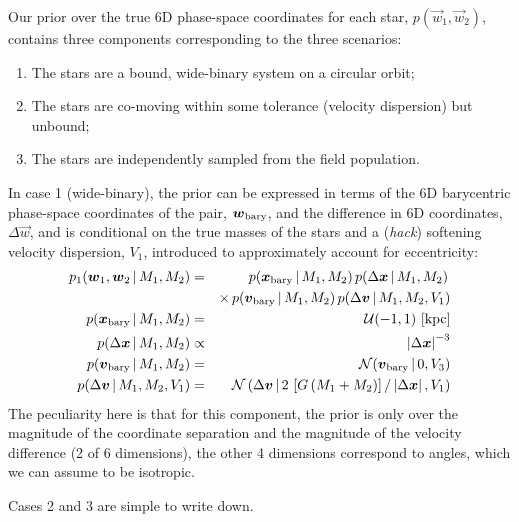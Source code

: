 \documentclass[12pt,letterpaper]{article}
\begin{document}
Our prior over the true 6D phase-space coordinates for each star, $p(\vec{w}_1,
\vec{w}_2)$, contains three components corresponding to the three scenarios:
\begin{enumerate}
    \item The stars are a bound, wide-binary system on a circular orbit;
    \item The stars are co-moving within some tolerance (velocity dispersion)
    but unbound;
    \item The stars are independently sampled from the field population.
\end{enumerate}
In case 1 (wide-binary), the prior can be expressed in terms of the 6D
barycentric phase-space coordinates of the pair, $\vec{w}_{\rm bary}$, and the
difference in 6D coordinates, $\Delta\vec{w}$, and is conditional on the true
masses of the stars and a (\emph{hack}) softening velocity dispersion, $V_1$,
introduced to approximately account for eccentricity:
\begin{eqnarray}
    p_1(\vec{w}_1, \vec{w}_2 \given M_1, M_2) &=&
        p(\vec{x}_{\rm bary} \given M_1, M_2) \,
        p(\Delta\vec{x} \given M_1, M_2) \, \\
    && \times \,
        p(\vec{v}_{\rm bary} \given M_1, M_2) \,
        p(\Delta\vec{v} \given M_1, M_2, V_1) \\
    p(\vec{x}_{\rm bary} \given M_1, M_2) &=& \mathcal{U}(-1,1)~[{\rm kpc}] \\
    p(\Delta\vec{x} \given M_1, M_2) &\propto& \left|\Delta\vec{x}\right|^{-3} \\
    p(\vec{v}_{\rm bary} \given M_1, M_2) &=&
      \mathcal{N}(\vec{v}_{\rm bary} \given 0, V_3) \\
    p(\Delta\vec{v} \given M_1, M_2, V_1) &=&
      \mathcal{N}\left(\Delta\vec{v} \given
        2\,\left[G \, (M_1+M_2)\right]/\left|\Delta\vec{x}\right|, V_1\right) \\
\end{eqnarray}
The peculiarity here is that for this component, the prior is only over the
magnitude of the coordinate separation and the magnitude of the velocity
difference (2 of 6 dimensions), the other 4 dimensions correspond to angles,
which we can assume to be isotropic.

Cases 2 and 3 are simple to write down.

%
\end{document}
